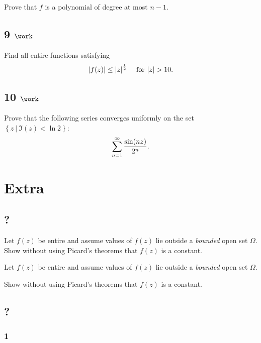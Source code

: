 Prove that \(f\) is a polynomial of degree at most \(n-1\).

\hypertarget{work-40}{%
\subsection{\texorpdfstring{9
\(\work\)}{9 \textbackslash work}}\label{work-40}}

Find all entire functions satisfying
\begin{align*}
{\left\lvert {f(z)} \right\rvert} \leq {\left\lvert {z} \right\rvert}^{1\over 2} \quad\text{ for } {\left\lvert {z} \right\rvert} > 10
.\end{align*}

\hypertarget{work-41}{%
\subsection{\texorpdfstring{10
\(\work\)}{10 \textbackslash work}}\label{work-41}}

Prove that the following series converges uniformly on the set
\(\left\{{z {~\mathrel{\Big|}~}\Im(z) < \ln 2}\right\}\):
\begin{align*}
\sum_{n=1}^\infty {\sin(nz) \over 2^n}
.\end{align*}

\hypertarget{extra-1}{%
\section{Extra}\label{extra-1}}

\hypertarget{section-6}{%
\subsection{?}\label{section-6}}

Let \(f(z)\) be entire and assume values of \(f(z)\) lie outside a
\emph{bounded} open set \(\Omega\). Show without using Picard's theorems
that \(f(z)\) is a constant.

Let \(f(z)\) be entire and assume values of \(f(z)\) lie outside a
\emph{bounded} open set \(\Omega\).

Show without using Picard's theorems that \(f(z)\) is a constant.

\hypertarget{section-7}{%
\subsection{?}\label{section-7}}

\hypertarget{section-8}{%
\subsubsection{1}\label{section-8}}

